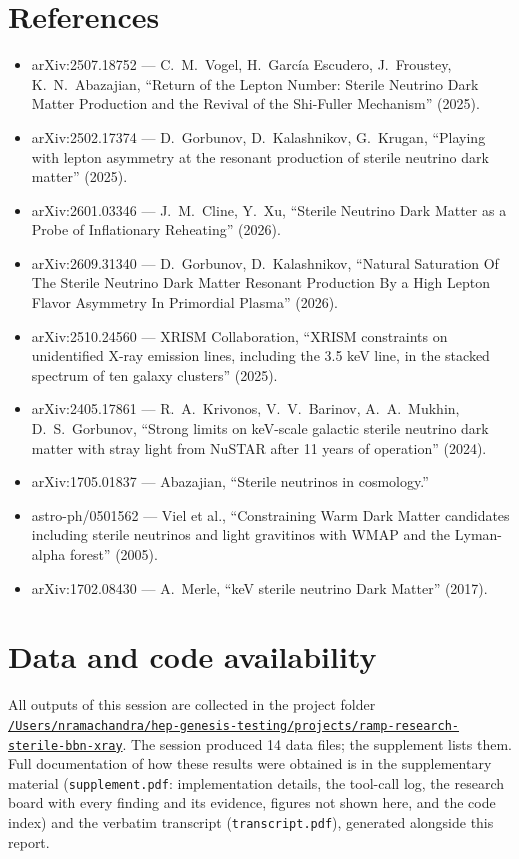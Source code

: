 \documentclass[11pt,a4paper]{article}
\begin{document}
\section*{References}
\begin{itemize}
\item arXiv:2507.18752 --- C.~M.~Vogel, H.~Garc\'ia Escudero, J.~Froustey, K.~N.~Abazajian, ``Return of the Lepton Number: Sterile Neutrino Dark Matter Production and the Revival of the Shi-Fuller Mechanism'' (2025).
\item arXiv:2502.17374 --- D.~Gorbunov, D.~Kalashnikov, G.~Krugan, ``Playing with lepton asymmetry at the resonant production of sterile neutrino dark matter'' (2025).
\item arXiv:2601.03346 --- J.~M.~Cline, Y.~Xu, ``Sterile Neutrino Dark Matter as a Probe of Inflationary Reheating'' (2026).
\item arXiv:2609.31340 --- D.~Gorbunov, D.~Kalashnikov, ``Natural Saturation Of The Sterile Neutrino Dark Matter Resonant Production By a High Lepton Flavor Asymmetry In Primordial Plasma'' (2026).
\item arXiv:2510.24560 --- XRISM Collaboration, ``XRISM constraints on unidentified X-ray emission lines, including the 3.5 keV line, in the stacked spectrum of ten galaxy clusters'' (2025).
\item arXiv:2405.17861 --- R.~A.~Krivonos, V.~V.~Barinov, A.~A.~Mukhin, D.~S.~Gorbunov, ``Strong limits on keV-scale galactic sterile neutrino dark matter with stray light from NuSTAR after 11 years of operation'' (2024).
\item arXiv:1705.01837 --- Abazajian, ``Sterile neutrinos in cosmology.''
\item astro-ph/0501562 --- Viel et al., ``Constraining Warm Dark Matter candidates including sterile neutrinos and light gravitinos with WMAP and the Lyman-alpha forest'' (2005).
\item arXiv:1702.08430 --- A.~Merle, ``keV sterile neutrino Dark Matter'' (2017).
\end{itemize}

\section*{Data and code availability}
All outputs of this session are collected in the project folder \href{file:///Users/nramachandra/hep-genesis-testing/projects/ramp-research-sterile-bbn-xray}{\texttt{/\allowbreak{}Users/\allowbreak{}nramachandra/\allowbreak{}hep-genesis-testing/\allowbreak{}projects/\allowbreak{}ramp-research-sterile-bbn-xray}}.
The session produced 14 data files; the supplement lists them.
Full documentation of how these results were obtained is in the supplementary material (\texttt{supplement.pdf}: implementation details, the tool-call log, the research board with every finding and its evidence, figures not shown here, and the code index) and the verbatim transcript (\texttt{transcript.pdf}), generated alongside this report.
\end{document}
